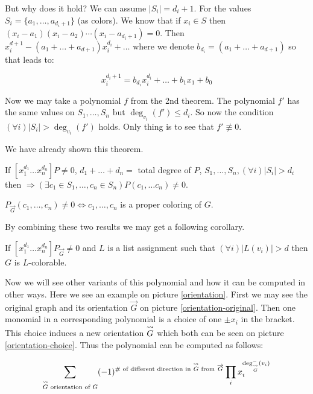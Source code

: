 But why does it hold? We can assume $|S_{i}| = d_{i} + 1$. For the values $S_{i} = \{a_{1}, \dots, a_{d_{i}+1}\}$ (as colors). We know that if $x_{i} \in S$ then $(x_{i} - a_{1}) (x_{i} - a_{2}) \cdots (x_{i} - a_{d_{i}+1}) = 0$. Then $x_{i}^{d+1} - (a_{1} + \dots + a_{d+1}) x_{i}^{d_{i}} + \dots$ where we denote $b_{d_{i}} = (a_{1} + \dots + a_{d+1})$ so that leads to:

$$
x_{i}^{d_{i}+1} = b_{d_{i}}x_{i}^{d_{i}} + \dots + b_{1}x_{1} + b_{0}
$$

Now we may take a polynomial $f$ from the 2nd theorem. The polynomial $f'$ has the same values on $S_{1}, \dots, S_{n}$ but $\deg_{v_{i}}(f') \leq d_{i}$. So now the condition $(\forall i) |S_{i}| > \deg_{v_{i}} (f')$ holds. Only thing is to see that $f' \not\equiv 0$.

We have already shown this theorem.

\begin{thm}
	If $[x_{1}^{d_1} \dots x_{n}^{d_n}]P \neq 0$, $d_1 + \dots + d_n = $ total degree of $P$, $S_1, \dots, S_{n}, (\forall i) |S_i| > d_i$ then $\Rightarrow (\exists c_{1} \in S_{1}, \dots, c_{n} \in S_{n}) P(c_{1}, \dots c_n) \neq 0$.
\end{thm}

\begin{observ}
	$P_{\overrightarrow{G}} (c_1, \dots, c_n) \neq 0 \Leftrightarrow c_1, \dots, c_n$ is a proper coloring of $G$.
\end{observ}

By combining these two results we may get a following corollary.

\begin{cor}
	If $[x_{1}^{d_1} \dots x_{n}^{d_n}]P_{\overrightarrow{G}} \neq 0$ and $L$ is a list assignment such that $(\forall i) |L(v_i)| > d$ then $G$ is $L$-colorable.
\end{cor}

Now we will see other variants of this polynomial and how it can be computed in other ways. Here we see an example on picture \ref{orientation}. First we may see the original graph and its orientation $\overrightarrow{G}$ on picture \ref{orientation-original}. Then one monomial in a corresponding polynomial is a choice of one $\pm x_{i}$ in the bracket. This choice induces a new orientation $\mathrel{\overset{\leadsto}{G}}$ which both can be seen on picture \ref{orientation-choice}. Thus the polynomial can be computed as follows:

$$
\sum_{\mathrel{\overset{\leadsto}{G}} \text{ orientation of }G} (-1)^{\text{\# of different direction in } \mathrel{\overset{\leadsto}{G}} \text{ from } \overrightarrow{G}} \prod_{i} x_{i}^{\deg^{-}_{\mathrel{\overset{\leadsto}{G}}}(v_{i})}
$$

